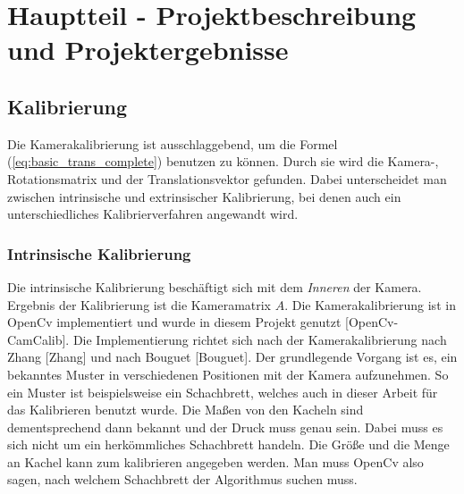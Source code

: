 \section{Hauptteil - Projektbeschreibung und Projektergebnisse}\label{ergebnisse}
	\subsection{Kalibrierung}
		Die Kamerakalibrierung ist ausschlaggebend, um die Formel (\ref{eq:basic_trans_complete}) benutzen zu können. Durch sie wird die Kamera-, Rotationsmatrix und der Translationsvektor gefunden. Dabei unterscheidet man zwischen intrinsische und extrinsischer Kalibrierung, bei denen auch ein unterschiedliches Kalibrierverfahren angewandt wird.
		
		\label{chap:kalibierung}
		\subsubsection{Intrinsische Kalibrierung}
		Die intrinsische Kalibrierung beschäftigt sich mit dem \textit{Inneren} der Kamera. Ergebnis der Kalibrierung ist die Kameramatrix \( A \). Die Kamerakalibrierung ist in OpenCv implementiert und wurde in diesem Projekt genutzt [OpenCv-CamCalib]. Die Implementierung richtet sich nach der Kamerakalibrierung nach Zhang [Zhang] und nach Bouguet [Bouguet]. \newline
		Der grundlegende Vorgang ist es, ein bekanntes Muster in verschiedenen Positionen mit der Kamera aufzunehmen. So ein Muster ist beispielsweise ein Schachbrett, welches auch in dieser Arbeit für das Kalibrieren benutzt wurde. Die Maßen von den Kacheln sind dementsprechend dann bekannt und der Druck muss genau sein. Dabei muss es sich nicht um ein herkömmliches Schachbrett handeln. Die Größe und die Menge an Kachel kann zum kalibrieren angegeben werden. Man muss OpenCv also sagen, nach welchem Schachbrett der Algorithmus suchen muss.
		
